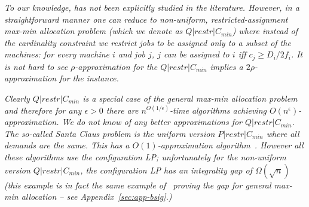 \begin{remark}\label{rem:cckp-prev}\emph{
	To our knowledge, \cckp has not been explicitly studied in the literature. %
	However, in a straightforward manner one can reduce \cckp to {\em non-uniform}, restricted-assignment max-min allocation problem (which we denote as $Q|restr|C_{min}$) where instead of the cardinality constraint we restrict jobs to be assigned only to a subset of the machines: 
	for every machine $i$ and job $j$, $j$ can be assigned to $i$ iff $c_j \geq D_i/2f_i$. It is not hard to see $\rho$-approximation for the $Q|restr|C_{min}$ implies a $2\rho$-approximation for the \cckp instance.
}

\emph{
Clearly $Q|restr|C_{min}$  is a special case of the general max-min allocation problem~\cite{ChakrabartyChuzhoyKhanna09} and therefore for any $\epsilon>0$ there are $n^{O(1/\epsilon)}$-time algorithms
achieving $O(n^\epsilon)$-approximation. We do not know of any better approximations for $Q|restr|C_{min}$. The so-called Santa Claus problem is the {\em uniform} version $P|restr|C_{min}$ where all demands are the same. This has a $O(1)$-approximation algorithm~\cite{Feige, AFS, Ola and gang}. However all these algorithms use the configuration LP; unfortunately for the non-uniform version $Q|restr|C_{min}$, the configuration LP has an integrality gap of $\Omega(\sqrt{n})$ (this example is in fact the same example of~\cite{Bansal Sviridenko} proving the gap for general max-min allocation -- see Appendix~\ref{sec:app-bsig}.)}
\end{remark}


